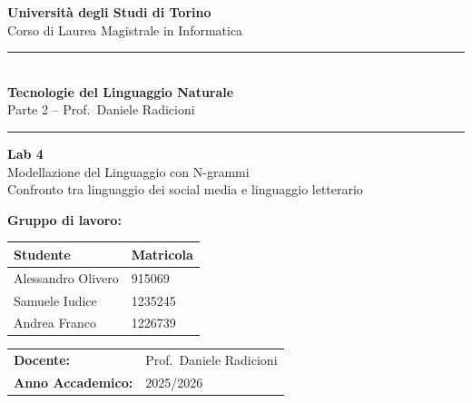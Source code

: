 ﻿\documentclass[12pt,a4paper]{article}
\newcommand{\HRule}{\rule{\linewidth}{0.5mm}}
\begin{document}
\raggedbottom

\begin{titlepage}
  \centering
  \vspace*{1.5cm}

  {\Large\textbf{Università degli Studi di Torino}\\[0.3em]
  Corso di Laurea Magistrale in Informatica}

  \vspace{1cm}
  \HRule\\[0.4em]
  {\LARGE\textbf{Tecnologie del Linguaggio Naturale}}\\[0.3em]
  {\large Parte 2 -- Prof.\ Daniele Radicioni}\\[0.2em]
  \HRule

  \vspace{1.2cm}
  {\huge\textbf{Lab 4}}\\[0.5em]
  {\LARGE Modellazione del Linguaggio con N-grammi}\\[0.4em]
  {\large Confronto tra linguaggio dei social media e linguaggio letterario}

  \vspace{2cm}

  {\large\textbf{Gruppo di lavoro:}}\\[0.8em]
  \begin{tabular}{ll}
    \toprule
    \textbf{Studente}    & \textbf{Matricola} \\
    \midrule
    Alessandro Olivero   & 915069  \\
    Samuele Iudice       & 1235245 \\
    Andrea Franco        & 1226739 \\
    \bottomrule
  \end{tabular}

  \vspace{1.5cm}
  \begin{tabular}{ll}
    \textbf{Docente:}          & Prof.\ Daniele Radicioni \\[0.3em]
    \textbf{Anno Accademico:}  & 2025/2026 \\
  \end{tabular}

  \vfill
\end{titlepage}

\tableofcontents
\newpage

\end{document}
